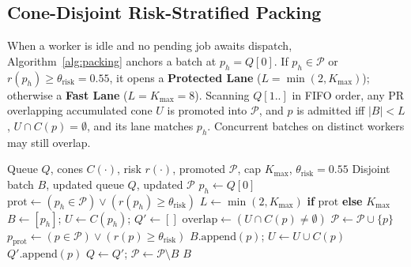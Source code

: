\subsection{Cone-Disjoint Risk-Stratified Packing}
When a worker is idle and no pending job awaits dispatch, Algorithm~\ref{alg:packing} anchors a batch at $p_h = Q[0]$. If $p_h \in \mathcal{P}$ or $r(p_h) \ge \theta_{\text{risk}} = 0.55$, it opens a \textbf{Protected Lane} ($L=\min(2, K_{\max})$); otherwise a \textbf{Fast Lane} ($L=K_{\max}=8$). Scanning $Q[1..]$ in FIFO order, any PR overlapping accumulated cone $U$ is promoted into $\mathcal{P}$, and $p$ is admitted iff $|B|<L$, $U\cap C(p)=\emptyset$, and its lane matches $p_h$. Concurrent batches on distinct workers may still overlap.

\begin{algorithm}[t]
\caption{Graph-Disjoint Risk-Stratified Batch Packing}
\label{alg:packing}
\begin{algorithmic}[1]
\REQUIRE Queue $Q$, cones $C(\cdot)$, risk $r(\cdot)$, promoted $\mathcal{P}$, cap $K_{\max}$, $\theta_{\text{risk}}=0.55$
\ENSURE Disjoint batch $B$, updated queue $Q$, updated $\mathcal{P}$
\STATE $p_h \leftarrow Q[0]$ 
\STATE $\text{prot} \leftarrow (p_h \in \mathcal{P}) \lor (r(p_h) \ge \theta_{\text{risk}})$
\STATE $L \leftarrow \min(2, K_{\max})$ \textbf{if} $\text{prot}$ \textbf{else} $K_{\max}$
\STATE $B \leftarrow [p_h]$; \quad $U \leftarrow C(p_h)$; \quad $Q' \leftarrow []$
    \STATE $\text{overlap} \leftarrow (U \cap C(p) \neq \emptyset)$
        \STATE $\mathcal{P} \leftarrow \mathcal{P} \cup \{p\}$ 
    \ENDIF
    \STATE $p_{\text{prot}} \leftarrow (p \in \mathcal{P}) \lor (r(p) \ge \theta_{\text{risk}})$
        \STATE $B.\text{append}(p)$; \quad $U \leftarrow U \cup C(p)$
    \ELSE
        \STATE $Q'.\text{append}(p)$
    \ENDIF
\ENDFOR
\STATE $Q \leftarrow Q'$; \quad $\mathcal{P} \leftarrow \mathcal{P} \setminus B$
\RETURN $B$
\end{algorithmic}
\end{algorithm}

